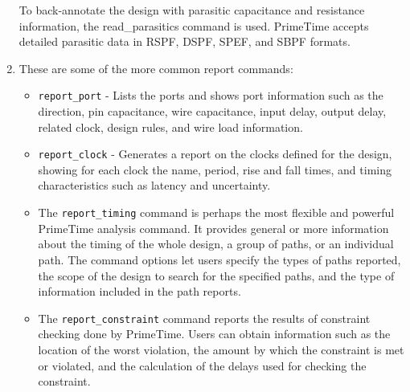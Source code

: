 \documentclass[a4paper,12pt,twoside]{article}
\begin{document}
\begin{enumerate}
    To back-annotate the design with parasitic capacitance and resistance information, the read\_parasitics command is used. PrimeTime accepts detailed parasitic data in RSPF, DSPF, SPEF, and SBPF formats.
    \item These are some of the more common report commands:
    \begin{itemize}
        \item \texttt{report\_port} - Lists the ports and shows port information such as the direction, pin capacitance, wire capacitance, input delay, output delay, related clock, design rules, and wire load information.
        \item \texttt{report\_clock} - Generates a report on the clocks defined for the design, showing for each clock the name, period, rise and fall times, and timing characteristics such as latency and uncertainty.
        \item The \texttt{report\_timing} command is perhaps the most flexible and powerful PrimeTime analysis command. It provides general or more information about the timing of the whole design, a group of paths, or an individual path. The command options let users specify the types of paths reported, the scope of the design to search for the specified paths, and the type of information included in the path reports.
        \item The \texttt{report\_constraint} command reports the results of constraint checking done by PrimeTime. Users can obtain information such as the location of the worst violation, the amount by which the constraint is met or violated, and the calculation of the delays used for checking the constraint.
    \end{itemize}
\end{enumerate}
\end{document}
